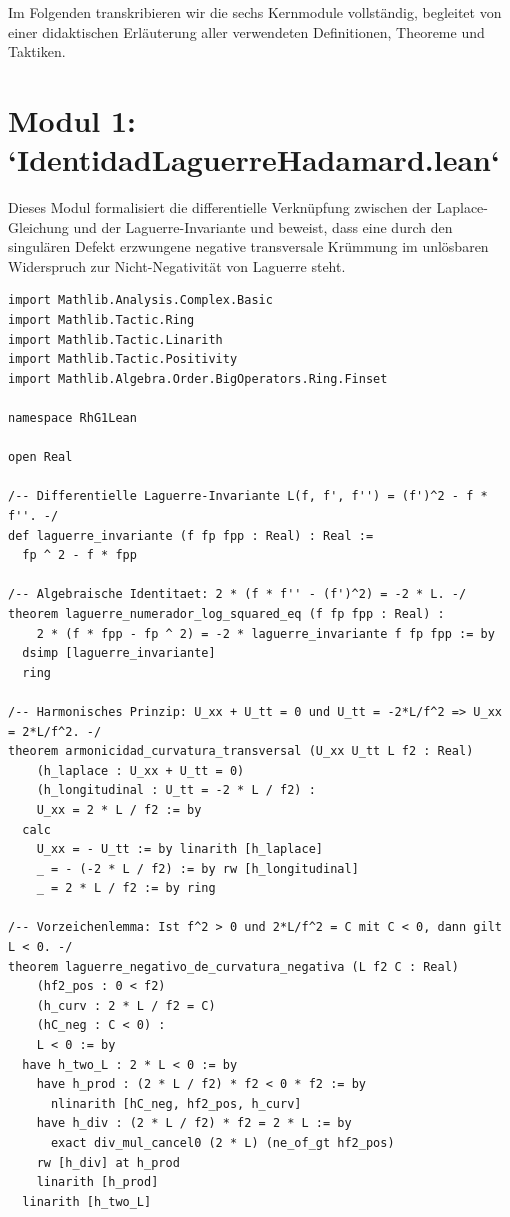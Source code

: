 \documentclass[11pt,a4paper]{article}
\theoremstyle{definition}
\theoremstyle{remark}
\begin{document}
Im Folgenden transkribieren wir die sechs Kernmodule vollständig, begleitet von einer didaktischen Erläuterung aller verwendeten Definitionen, Theoreme und Taktiken.

\section{Modul 1: `IdentidadLaguerreHadamard.lean`}

Dieses Modul formalisiert die differentielle Verknüpfung zwischen der Laplace-Gleichung und der Laguerre-Invariante und beweist, dass eine durch den singulären Defekt erzwungene negative transversale Krümmung im unlösbaren Widerspruch zur Nicht-Negativität von Laguerre steht.

\begin{lstlisting}[language=Lean4]
import Mathlib.Analysis.Complex.Basic
import Mathlib.Tactic.Ring
import Mathlib.Tactic.Linarith
import Mathlib.Tactic.Positivity
import Mathlib.Algebra.Order.BigOperators.Ring.Finset

namespace RhG1Lean

open Real

/-- Differentielle Laguerre-Invariante L(f, f', f'') = (f')^2 - f * f''. -/
def laguerre_invariante (f fp fpp : Real) : Real :=
  fp ^ 2 - f * fpp

/-- Algebraische Identitaet: 2 * (f * f'' - (f')^2) = -2 * L. -/
theorem laguerre_numerador_log_squared_eq (f fp fpp : Real) :
    2 * (f * fpp - fp ^ 2) = -2 * laguerre_invariante f fp fpp := by
  dsimp [laguerre_invariante]
  ring

/-- Harmonisches Prinzip: U_xx + U_tt = 0 und U_tt = -2*L/f^2 => U_xx = 2*L/f^2. -/
theorem armonicidad_curvatura_transversal (U_xx U_tt L f2 : Real)
    (h_laplace : U_xx + U_tt = 0)
    (h_longitudinal : U_tt = -2 * L / f2) :
    U_xx = 2 * L / f2 := by
  calc
    U_xx = - U_tt := by linarith [h_laplace]
    _ = - (-2 * L / f2) := by rw [h_longitudinal]
    _ = 2 * L / f2 := by ring

/-- Vorzeichenlemma: Ist f^2 > 0 und 2*L/f^2 = C mit C < 0, dann gilt L < 0. -/
theorem laguerre_negativo_de_curvatura_negativa (L f2 C : Real)
    (hf2_pos : 0 < f2)
    (h_curv : 2 * L / f2 = C)
    (hC_neg : C < 0) :
    L < 0 := by
  have h_two_L : 2 * L < 0 := by
    have h_prod : (2 * L / f2) * f2 < 0 * f2 := by
      nlinarith [hC_neg, hf2_pos, h_curv]
    have h_div : (2 * L / f2) * f2 = 2 * L := by
      exact div_mul_cancel0 (2 * L) (ne_of_gt hf2_pos)
    rw [h_div] at h_prod
    linarith [h_prod]
  linarith [h_two_L]


\end{lstlisting}
\end{document}
